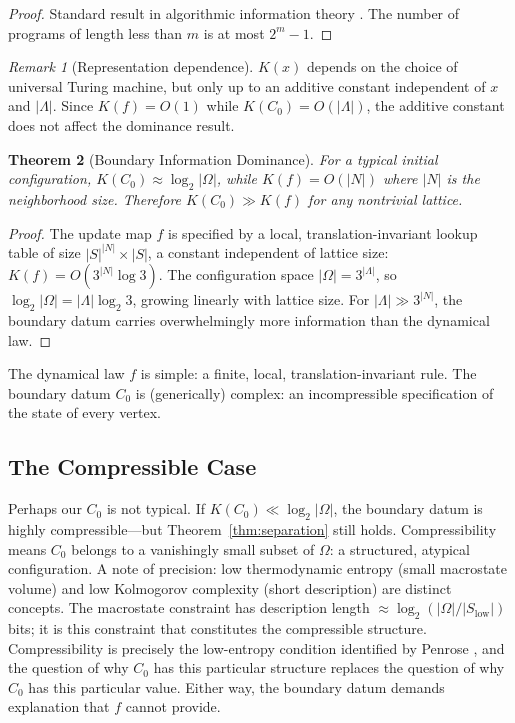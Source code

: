 \documentclass[12pt]{article}
\theoremstyle{plain}
\newtheorem{theorem}{Theorem}[section]
\theoremstyle{definition}
\theoremstyle{remark}
\newtheorem{remark}[theorem]{Remark}
\newcommand{\Lattice}{\Lambda}
\begin{document}
\begin{proof}
Standard result in algorithmic information theory \cite{kolmogorov1965,chaitin1966}. The number of programs of length less than $m$ is at most $2^m - 1$.
\end{proof}

\begin{remark}[Representation dependence]\label{rem:representation}
$K(x)$ depends on the choice of universal Turing machine, but only up to an additive constant independent of $x$ and $|\Lattice|$. Since $K(f) = O(1)$ while $K(C_0) = O(|\Lattice|)$, the additive constant does not affect the dominance result.
\end{remark}

\begin{theorem}[Boundary Information Dominance]\label{thm:dominance}
For a typical initial configuration, $K(C_0) \approx \log_2|\Omega|$, while $K(f) = O(|N|)$ where $|N|$ is the neighborhood size. Therefore $K(C_0) \gg K(f)$ for any nontrivial lattice.
\end{theorem}

\begin{proof}
The update map $f$ is specified by a local, translation-invariant lookup table of size $|S|^{|N|} \times |S|$, a constant independent of lattice size: $K(f) = O(3^{|N|} \log 3)$. The configuration space $|\Omega| = 3^{|\Lattice|}$, so $\log_2|\Omega| = |\Lattice| \log_2 3$, growing linearly with lattice size. For $|\Lattice| \gg 3^{|N|}$, the boundary datum carries overwhelmingly more information than the dynamical law.
\end{proof}

The dynamical law $f$ is simple: a finite, local, translation-invariant rule. The boundary datum $C_0$ is (generically) complex: an incompressible specification of the state of every vertex.

\subsection{The Compressible Case}

Perhaps our $C_0$ is not typical. If $K(C_0) \ll \log_2|\Omega|$, the boundary datum is highly compressible---but Theorem~\ref{thm:separation} still holds. Compressibility means $C_0$ belongs to a vanishingly small subset of $\Omega$: a structured, atypical configuration. A note of precision: low thermodynamic entropy (small macrostate volume) and low Kolmogorov complexity (short description) are distinct concepts. The macrostate constraint has description length $\approx \log_2(|\Omega|/|S_{\mathrm{low}}|)$ bits; it is this constraint that constitutes the compressible structure. Compressibility is precisely the low-entropy condition identified by Penrose \cite{penrose1989}, and the question of why $C_0$ has this particular structure replaces the question of why $C_0$ has this particular value. Either way, the boundary datum demands explanation that $f$ cannot provide.
\end{document}
